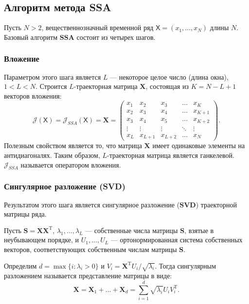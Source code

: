 \documentclass[a4paper, 11pt]{article}
\newcommand{\SSA}{\textbf{SSA}}
\newcommand{\TS}{\mathsf{X}}
\begin{document}
\subsection{Алгоритм метода SSA}

Пусть $N > 2$, вещественнозначный временной ряд
$\TS = (x_1, \dots, x_{N})$ длины $N$.
Базовый алгоритм $\SSA$ состоит из четырех шагов.

\subsubsection{Вложение}
Параметром этого шага является $L$ --- некоторое целое число (длина окна), $1 < L < N$. Строится $L$-траекторная матрица $\mathbf{X}$, состоящая из $K = N - L + 1$ векторов вложения:
\begin{equation}
	\label{eq:X}
	\mathcal{J} \left(\TS \right) = \mathcal{J}_{SSA} \left(\TS \right)=
	\mathbf{X} =
	\begin{pmatrix}
		x_1    & x_2     & x_3     & \dots  & x_{K}   \\
		x_2    & x_3     & x_4     & \dots  & x_{K+1} \\
		x_3    & x_4     & x_5     & \dots  & x_{K+2} \\
		\vdots & \vdots  & \vdots  & \ddots & \vdots  \\
		x_{L}  & x_{L+1} & x_{L+2} & \dots  & x_{N}
	\end{pmatrix}.
\end{equation}
Полезным свойством является то, что матрица $\mathbf{X}$ имеет одинаковые элементы на антидиагоналях. Таким образом, $L$-траекторная матрица является ганкелевой. $\mathcal{J}_{SSA}$ называется оператором вложения.

\subsubsection{Сингулярное разложение (SVD)}
Результатом этого шага является сингулярное разложение ($\mathbf{SVD}$) траекторной матрицы ряда.

Пусть $\mathbf{S} = \mathbf{X}\mathbf{X}^{\mathrm{T}}$,
$\lambda_1, \dots, \lambda_L$ --- собственные числа матрицы $\mathbf{S}$, взятые в неубывающем порядке, и
$U_1, \dots, U_L$ --- ортонормированная система собственных векторов, соответствующих собственным числам матрицы $\mathbf S$.

Определим $d = \max{ \{i: \lambda_i > 0 \}}$ и
$V_i = \mathbf{X}^{\mathrm{T}} U_i / \sqrt{\lambda_i}$.
Тогда сингулярным разложением называется представление матрицы в виде:
\begin{equation}
	\mathbf{X} = \mathbf{X}_1 + \dots + \mathbf{X}_d =
	\sum_{i = 1}^{d} \sqrt{\lambda_i} U_i V_{i}^{\mathrm{T}}\label{eq:1}.
\end{equation}
\end{document}
